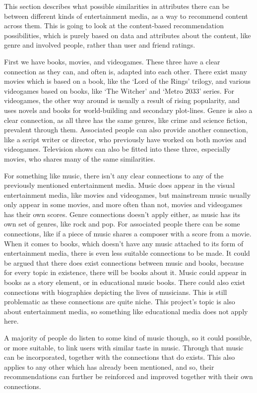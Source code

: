 This section describes what possible similarities in attributes there can be between different kinds of entertainment media, as a way to recommend content across them. This is going to look at the content-based recommendation possibilities, which is purely based on data and attributes about the content, like genre and involved people, rather than user and friend ratings.

First we have books, movies, and videogames. These three have a clear connection as they can, and often is, adapted into each other. There exist many movies which is based on a book, like the ‘Lord of the Rings’ trilogy, and various videogames based on books, like ‘The Witcher’ and ‘Metro 2033’ series. For videogames, the other way around is usually a result of rising popularity, and uses novels and books for world-building and secondary plot-lines. Genre is also a clear connection, as all three has the same genres, like crime and science fiction, prevalent through them. Associated people can also provide another connection, like a script writer or director, who previously have worked on both movies and videogames. Television shows can also be fitted into these three, especially movies, who shares many of the same similarities.

For something like music, there isn’t any clear connections to any of the previously mentioned entertainment media. Music does appear in the visual entertainment media, like movies and videogames, but mainstream music usually only appear in some movies, and more often than not, movies and videogames has their own scores. Genre connections doesn’t apply either, as music has its own set of genres, like rock and pop. For associated people there can be some connections, like if a piece of music shares a composer with a score from a movie. When it comes to books, which doesn’t have any music attached to its form of entertainment media, there is even less suitable connections to be made. It could be argued that there does exist connections between music and books, because for every topic in existence, there will be books about it. Music could appear in books as a story element, or in educational music books. There could also exist connections with biographies depicting the lives of musicians. This is still problematic as these connections are quite niche. This project’s topic is also about entertainment media, so something like educational media does not apply here. 

A majority of people do listen to some kind of music though, so it could possible, or more suitable, to link users with similar taste in music. Through that music can be incorporated, together with the connections that do exists. This also applies to any other which has already been mentioned, and so, their recommendations can further be reinforced and improved together with their own connections.

